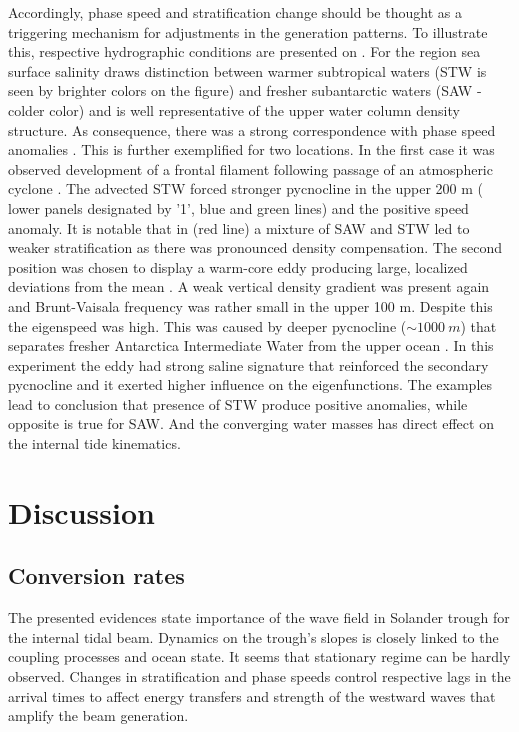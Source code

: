 \documentclass[12pt]{article}
\begin{document}
Accordingly, phase speed and stratification change should be thought as a triggering mechanism for 
adjustments in the generation patterns. To illustrate this, respective hydrographic conditions are 
presented on . For the region sea surface salinity draws distinction 
between warmer 
subtropical waters (STW is seen by brighter colors on the figure) and fresher subantarctic waters 
(SAW - colder color) and is well representative of the upper water column density structure. As 
consequence, there was a strong correspondence with phase speed anomalies 
. This is further exemplified for two locations. In the 
first case it was observed development of a frontal filament following passage of an atmospheric 
cyclone . The advected STW forced stronger pycnocline in the 
upper 
200 m ( lower panels designated by '1', blue and green lines) and the 
positive speed anomaly. It is notable that in  (red line) a mixture of SAW and STW led to 
weaker stratification as there was pronounced density compensation. The second position was chosen 
to display a warm-core eddy producing large, localized deviations from the mean 
. A weak vertical density gradient was present again and 
Brunt-Vaisala frequency was rather small in the upper 100 m. Despite this the eigenspeed was high. 
This was caused by deeper pycnocline ($\sim 1000~m$) that separates fresher Antarctica Intermediate 
Water from the upper ocean \citep{chiswell2015physical}. In this experiment the eddy had strong 
saline signature that reinforced the secondary pycnocline and it exerted higher 
influence on the eigenfunctions. The examples lead to conclusion that presence of STW produce 
positive anomalies, while opposite is true for SAW. And the converging water masses has 
direct effect on the internal tide kinematics.

\section{Discussion}
\subsection{Conversion rates}
The presented evidences state importance of the wave field in Solander trough for the internal 
tidal beam. Dynamics on the trough's slopes is closely linked to the coupling processes 
and ocean state. It seems that stationary regime can be hardly observed. Changes in stratification 
and phase speeds control respective lags in the arrival times to affect energy transfers and 
strength of the westward waves that amplify the beam generation.\\
\end{document}
